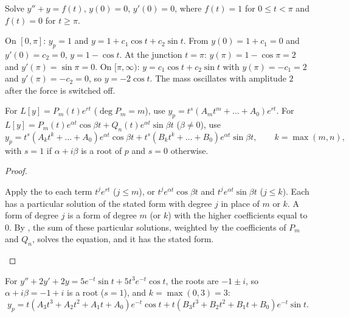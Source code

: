\documentclass[10pt]{scrartcl}
\begin{document}
\begin{example*}
  Solve $y''+y=f(t)$, $y(0)=0$, $y'(0)=0$, where $f(t)=1$ for $0\le t<\pi$ and $f(t)=0$ for $t\ge\pi$.
  \begin{steps}
    \ii On $[0,\pi]$: $y_p=1$ and $y=1+c_1\cos t+c_2\sin t$. From $y(0)=1+c_1=0$ and $y'(0)=c_2=0$, $y=1-\cos t$.
    \ii At the junction $t=\pi$: $y(\pi)=1-\cos\pi=2$ and $y'(\pi)=\sin\pi=0$.
    \ii On $[\pi,\infty)$: $y=c_1\cos t+c_2\sin t$ with $y(\pi)=-c_1=2$ and $y'(\pi)=-c_2=0$, so $y=-2\cos t$. The mass oscillates with amplitude $2$ after the force is switched off.
  \end{steps}
\end{example*}

\begin{theorem*}
  For $L[y]=P_m(t)e^{rt}$ ($\deg P_m=m$), use $y_p=t^s(A_m t^m+\dots+A_0)e^{rt}$. For $L[y]=P_m(t)e^{\alpha t}\cos\beta t+Q_n(t)e^{\alpha t}\sin\beta t$ ($\beta\neq 0$), use
  \[
    y_p = t^s(A_k t^k+\dots+A_0)e^{\alpha t}\cos\beta t + t^s(B_k t^k+\dots+B_0)e^{\alpha t}\sin\beta t,\qquad k=\max(m,n),
  \]
  with $s=1$ if $\alpha+i\beta$ is a root of $p$ and $s=0$ otherwise.
\end{theorem*}
\begin{proof}
  \begin{steps}
    \ii Apply the  to each term $t^j e^{rt}$ ($j\le m$), or $t^j e^{\alpha t}\cos\beta t$ and $t^j e^{\alpha t}\sin\beta t$ ($j\le k$). Each has a particular solution of the stated form with degree $j$ in place of $m$ or $k$.
    \ii A form of degree $j$ is a form of degree $m$ (or $k$) with the higher coefficients equal to $0$.
    \ii By , the sum of these particular solutions, weighted by the coefficients of $P_m$ and $Q_n$, solves the equation, and it has the stated form. \qedhere
  \end{steps}
\end{proof}

\begin{example*}
  For $y''+2y'+2y=5e^{-t}\sin t+5t^3e^{-t}\cos t$, the roots are $-1\pm i$, so $\alpha+i\beta=-1+i$ is a root ($s=1$), and $k=\max(0,3)=3$:
  \[
    y_p = t(A_3t^3+A_2t^2+A_1t+A_0)e^{-t}\cos t + t(B_3t^3+B_2t^2+B_1t+B_0)e^{-t}\sin t.
  \]
\end{example*}
\end{document}
